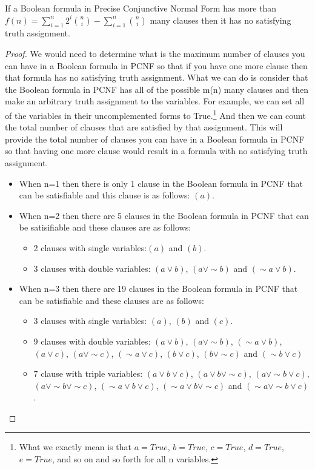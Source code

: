 \documentclass[runningheads,a4paper]{llncs}
\let\oldsim\sim
\renewcommand{\sim}{{\oldsim}}
\begin{document}
\begin{theorem}\normalfont

If a Boolean formula in Precise Conjunctive Normal Form has more than $f(n) = \sum_{i=1}^{n} 2^{i} \binom{n} {i} - \sum_{i=1}^{n} \binom{n} {i}$  many clauses then it has no satisfying truth assignment.
\begin{proof} 

We would need to determine what is the maximum number of clauses you can have in a Boolean formula in PCNF so that if you have one more clause then that formula has no satisfying truth assignment. What we can do is consider that the Boolean formula in PCNF has all of the possible m(n) many clauses and then make an arbitrary truth assignment to the variables. For example, we can set all of the variables in their uncomplemented forms to True.\footnote{What we exactly mean is that $a=True$, $b=True$, $c=True$, $d=True$, $e=True$, and so on and so forth for all n variables.} And then we can count the total number of clauses that are satisfied by that assignment. This will provide the total number of clauses you can have in a Boolean formula in PCNF so that having one more clause would result in a formula with no satisfying truth assignment. 

\begin{itemize}
\item When n=1 then there is only 1 clause in the Boolean formula in PCNF that can be satisfiable and this clause is as follows: $(a)$.
 
\item When n=2 then there are 5 clauses in the Boolean formula in PCNF that can be satisifiable and these clauses are as follows:
    \begin{itemize}
    \item 2 clauses with single variables:$(a)$ and $(b)$.
    \item 3 clauses with double variables: $({a}\vee {b})$, $({a}\vee \sim {b})$ and $(\sim {a}\vee {b})$.
     \end{itemize}
\item When n=3 then there are 19 clauses in the Boolean formula in PCNF that can be satisfiable and these clauses are as follows:
    \begin{itemize}
    \item 3 clauses with single variables: $(a)$, $(b)$ and $(c)$.
    \item 9 clauses with double variables: $({a}\vee {b})$, $({a}\vee \sim {b})$, $(\sim {a}\vee {b})$,  $({a}\vee {c})$, $({a}\vee \sim {c})$, $(\sim {a}\vee {c})$,  $({b}\vee {c})$, $({b}\vee \sim {c})$ and $(\sim {b}\vee {c})$
    \item 7 clause with triple variables: $({a}\vee {b} \vee {c})$, $({a}\vee {b} \vee \sim {c})$, $({a}\vee \sim {b} \vee {c})$, $({a}\vee \sim {b} \vee \sim {c})$, $(\sim {a}\vee {b} \vee {c})$, $(\sim {a}\vee {b} \vee \sim {c})$ and $( \sim {a}\vee \sim {b} \vee {c})$.
    \end{itemize}
\end{itemize}


\end{proof}
\end{theorem}
\end{document}
